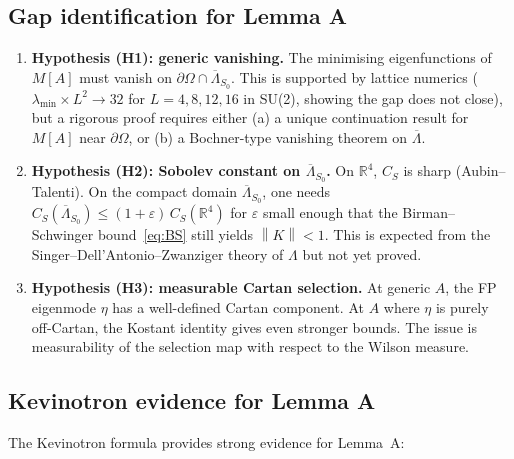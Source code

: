 \documentclass[11pt,a4paper]{amsart}
\theoremstyle{definition}
\theoremstyle{remark}
\newcommand{\R}{\mathbb{R}}
\newcommand{\norm}[1]{\left\lVert#1\right\rVert}
\begin{document}
\subsection{Gap identification for Lemma A}

\begin{enumerate}[label=\textcolor{red}{\textbf{Gap A.\arabic*}}, leftmargin=4em]
\item \textbf{Hypothesis (H1): generic vanishing.}
      The minimising eigenfunctions of $M[A]$ must vanish on $\partial\Omega
      \cap \overline{\Lambda}_{S_0}$. This is supported by lattice numerics
      ($\lambda_{\min} \times L^2 \to 32$ for $L = 4, 8, 12, 16$ in SU(2),
      showing the gap does not close), but a rigorous proof requires either
      (a) a unique continuation result for $M[A]$ near $\partial\Omega$, or
      (b) a Bochner-type vanishing theorem on $\overline{\Lambda}$.

\item \textbf{Hypothesis (H2): Sobolev constant on $\overline{\Lambda}_{S_0}$.}
      On $\R^4$, $C_S$ is sharp (Aubin--Talenti). On the compact domain
      $\overline{\Lambda}_{S_0}$, one needs $C_S(\overline{\Lambda}_{S_0})
      \leq (1+\varepsilon)\,C_S(\R^4)$ for $\varepsilon$ small enough that
      the Birman--Schwinger bound~\eqref{eq:BS} still yields $\norm{K} < 1$.
      This is expected from the Singer--Dell'Antonio--Zwanziger theory of
      $\Lambda$ but not yet proved.

\item \textbf{Hypothesis (H3): measurable Cartan selection.}
      At generic $A$, the FP eigenmode $\eta$ has a well-defined Cartan
      component. At $A$ where $\eta$ is purely off-Cartan, the Kostant
      identity gives even stronger bounds. The issue is measurability of
      the selection map with respect to the Wilson measure.
\end{enumerate}

\subsection{Kevinotron evidence for Lemma A}

The Kevinotron formula provides strong evidence for Lemma~A:
\end{document}

